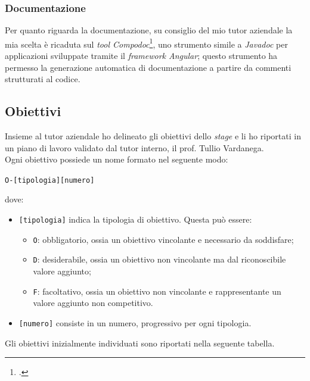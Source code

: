 \subsubsection*{Documentazione}
Per quanto riguarda la documentazione, su consiglio del mio tutor aziendale la mia scelta è ricaduta sul \textit{tool Compodoc}\footcite{tec:compodoc}, uno strumento simile a \textit{Javadoc} per applicazioni sviluppate tramite il \textit{framework Angular}; questo strumento ha permesso la generazione automatica di documentazione a partire da commenti strutturati al codice.

\subsection{Obiettivi}

Insieme al tutor aziendale ho delineato gli obiettivi dello \textit{stage} e li ho riportati in un piano di lavoro validato dal tutor interno, il prof. Tullio Vardanega. \\
Ogni obiettivo possiede un nome formato nel seguente modo:
\begin{center}
  \centering
  \texttt{O-[tipologia][numero]}
\end{center} dove:
\begin{itemize}
  \item \texttt{[tipologia]} indica la tipologia di obiettivo. Questa può essere:
  \begin{itemize}
    \item \texttt{O}: obbligatorio, ossia un obiettivo vincolante e necessario da soddisfare;
    \item \texttt{D}: desiderabile, ossia un obiettivo non vincolante ma dal riconoscibile valore aggiunto;
    \item \texttt{F}: facoltativo, ossia un obiettivo non vincolante e rappresentante un valore aggiunto non competitivo.
  \end{itemize}
  \item \texttt{[numero]} consiste in un numero, progressivo per ogni tipologia.
\end{itemize}

Gli obiettivi inizialmente individuati sono riportati nella seguente tabella.
\newpage

